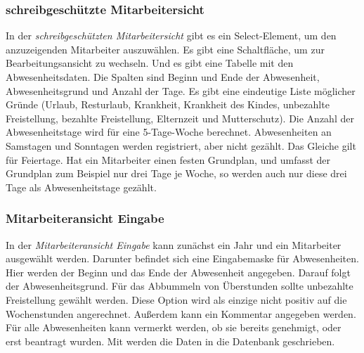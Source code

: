 \subsubsection{schreibgeschützte Mitarbeitersicht}
\begin{description}
    \item {}
\end{description}
In der \emph{schreibgeschützten Mitarbeitersicht} gibt es ein
Select-Element, um den anzuzeigenden Mitarbeiter auszuwählen. Es gibt eine
Schaltfläche, um zur Bearbeitungsansicht zu wechseln. Und es gibt eine
Tabelle mit den Abwesenheitsdaten. Die Spalten sind Beginn und Ende der
Abwesenheit, Abwesenheitsgrund und Anzahl der Tage. Es gibt eine eindeutige
Liste möglicher Gründe (Urlaub, Resturlaub, Krankheit, Krankheit des Kindes,
unbezahlte Freistellung, bezahlte Freistellung, Elternzeit und
Mutterschutz). Die Anzahl der Abwesenheitstage wird für eine 5-Tage-Woche
berechnet. Abwesenheiten an Samstagen und Sonntagen werden registriert, aber
nicht gezählt. Das Gleiche gilt für Feiertage.
Hat ein Mitarbeiter einen festen Grundplan, und umfasst der Grundplan zum Beispiel nur drei Tage je Woche, so werden auch nur diese drei Tage als Abwesenheitstage gezählt.

\subsubsection{Mitarbeiteransicht Eingabe}
\begin{description}
    \item {}
\end{description}
In der \emph{Mitarbeiteransicht Eingabe} kann zunächst ein Jahr und ein Mitarbeiter ausgewählt werden.
Darunter befindet sich eine Eingabemaske für Abwesenheiten.
Hier werden der Beginn und das Ende der Abwesenheit angegeben.
Darauf folgt der Abwesenheitsgrund. Für das Abbummeln von Überstunden sollte unbezahlte Freistellung gewählt werden. Diese Option wird als einzige nicht positiv auf die Wochenstunden angerechnet.
Außerdem kann ein Kommentar angegeben werden. Für alle Abwesenheiten kann vermerkt werden, ob sie bereits genehmigt, oder erst beantragt wurden. Mit  werden die Daten in die Datenbank geschrieben.

